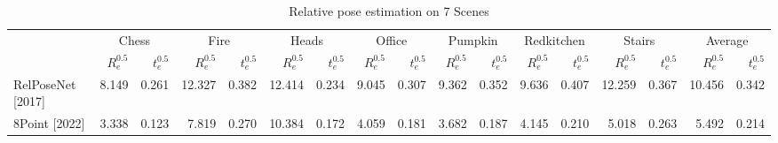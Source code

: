 \begin{table}[h!]
\centering
\caption{Relative pose estimation on 7 Scenes}
\label{tab:7scenes}
\begin{tabular}{lrrrrrrrrrrrrrrrr}
\toprule
 & \multicolumn{2}{c}{Chess} & \multicolumn{2}{c}{Fire} & \multicolumn{2}{c}{Heads} & \multicolumn{2}{c}{Office} & \multicolumn{2}{c}{Pumpkin} & \multicolumn{2}{c}{Redkitchen} & \multicolumn{2}{c}{Stairs} & \multicolumn{2}{c}{Average} \\
 & $R_e^{0.5}$ & $t_e^{0.5}$ & $R_e^{0.5}$ & $t_e^{0.5}$ & $R_e^{0.5}$ & $t_e^{0.5}$ & $R_e^{0.5}$ & $t_e^{0.5}$ & $R_e^{0.5}$ & $t_e^{0.5}$ & $R_e^{0.5}$ & $t_e^{0.5}$ & $R_e^{0.5}$ & $t_e^{0.5}$ & $R_e^{0.5}$ & $t_e^{0.5}$ \\
\midrule
RelPoseNet [2017]\cite{laskar2017camera} & {\cellcolor[HTML]{A50026}} \color[HTML]{F1F1F1} 8.149 & {\cellcolor[HTML]{A50026}} \color[HTML]{F1F1F1} 0.261 & {\cellcolor[HTML]{A50026}} \color[HTML]{F1F1F1} 12.327 & {\cellcolor[HTML]{A50026}} \color[HTML]{F1F1F1} 0.382 & {\cellcolor[HTML]{AB0626}} \color[HTML]{F1F1F1} 12.414 & {\cellcolor[HTML]{A50026}} \color[HTML]{F1F1F1} 0.234 & {\cellcolor[HTML]{A50026}} \color[HTML]{F1F1F1} 9.045 & {\cellcolor[HTML]{A50026}} \color[HTML]{F1F1F1} 0.307 & {\cellcolor[HTML]{A50026}} \color[HTML]{F1F1F1} 9.362 & {\cellcolor[HTML]{A50026}} \color[HTML]{F1F1F1} 0.352 & {\cellcolor[HTML]{A50026}} \color[HTML]{F1F1F1} 9.636 & {\cellcolor[HTML]{A50026}} \color[HTML]{F1F1F1} 0.407 & {\cellcolor[HTML]{A50026}} \color[HTML]{F1F1F1} 12.259 & {\cellcolor[HTML]{A50026}} \color[HTML]{F1F1F1} 0.367 & {\cellcolor[HTML]{A50026}} \color[HTML]{F1F1F1} 10.456 & {\cellcolor[HTML]{A50026}} \color[HTML]{F1F1F1} 0.342 \\
8Point [2022]\cite{rockwell20228} & {\cellcolor[HTML]{108647}} \color[HTML]{F1F1F1} 3.338 & {\cellcolor[HTML]{0E8245}} \color[HTML]{F1F1F1} 0.123 & {\cellcolor[HTML]{DAF08D}} \color[HTML]{000000} 7.819 & {\cellcolor[HTML]{FFF5AE}} \color[HTML]{000000} 0.270 & {\cellcolor[HTML]{F7844E}} \color[HTML]{F1F1F1} 10.384 & {\cellcolor[HTML]{FBFDBA}} \color[HTML]{000000} 0.172 & {\cellcolor[HTML]{3CA959}} \color[HTML]{F1F1F1} 4.059 & {\cellcolor[HTML]{9DD569}} \color[HTML]{000000} 0.181 & {\cellcolor[HTML]{0A7B41}} \color[HTML]{F1F1F1} 3.682 & {\cellcolor[HTML]{1B9950}} \color[HTML]{F1F1F1} 0.187 & {\cellcolor[HTML]{60BA62}} \color[HTML]{F1F1F1} 4.145 & {\cellcolor[HTML]{96D268}} \color[HTML]{000000} 0.210 & {\cellcolor[HTML]{39A758}} \color[HTML]{F1F1F1} 5.018 & {\cellcolor[HTML]{FFFAB6}} \color[HTML]{000000} 0.263 & {\cellcolor[HTML]{87CB67}} \color[HTML]{000000} 5.492 & {\cellcolor[HTML]{A7D96B}} \color[HTML]{000000} 0.214 \\

\end{tabular}
\end{table}
